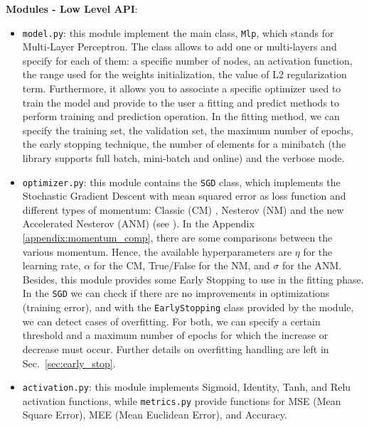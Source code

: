 \documentclass[11pt]{article}
\begin{document}
\noindent\textbf{Modules -  Low Level API}:
\begin{itemize}
    \item \texttt{model.py}: this module implement the main class, \texttt{Mlp}, which stands for Multi-Layer Perceptron. The class allows to add one or multi-layers and specify for each of them: a specific number of nodes, an activation function, the range used for the weights initialization, the value of L2 regularization term. Furthermore, it allows you to associate a specific optimizer used to train the model and provide to the user a fitting and predict methods to perform training and prediction operation. In the fitting method, we can specify the training set, the validation set, the maximum number of epochs, the early stopping technique, the number of elements for a minibatch (the library supports full batch, mini-batch and online) and the verbose mode.
    
    \item \texttt{optimizer.py}: this module contains the \texttt{SGD} class, which implements the Stochastic Gradient Descent with mean squared error as loss function and different types of momentum: Classic (CM) , Nesterov (NM) and the new Accelerated Nesterov (ANM) (see \cite{nakerst2020gradient}). In the Appendix \ref{appendix:momentum_comp}, there are some comparisons between the various momentum. Hence, the available hyperparameters are $\eta$ for the learning rate, $\alpha$  for the CM, True/False for the NM, and $\sigma$ for the ANM. Besides, this module provides some Early Stopping to use in the fitting phase. In the \texttt{SGD} we can check if there are no improvements in optimizations (training error), and with the \texttt{EarlyStopping} class provided by the module, we can detect cases of overfitting. For both, we can specify a certain threshold and a maximum number of epochs for which the increase or decrease must occur. Further details on overfitting handling are left in Sec.~\ref{sec:early_stop}.
    
    \item \texttt{activation.py}: this module implements Sigmoid, Identity, Tanh, and Relu activation functions, while \texttt{metrics.py} provide functions for MSE (Mean Square Error), MEE (Mean Euclidean Error), and Accuracy.
\end{itemize}
\end{document}
